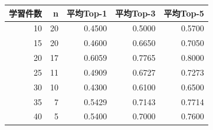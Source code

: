 \begin{tabular}{r r r r r}
\hline
学習件数 & n & 平均Top-1 & 平均Top-3 & 平均Top-5 \\
\hline
10 & 20 & 0.4500 & 0.5000 & 0.5700 \\
15 & 20 & 0.4600 & 0.6650 & 0.7050 \\
20 & 17 & 0.6059 & 0.7765 & 0.8000 \\
25 & 11 & 0.4909 & 0.6727 & 0.7273 \\
30 & 10 & 0.4300 & 0.6100 & 0.6500 \\
35 & 7 & 0.5429 & 0.7143 & 0.7714 \\
40 & 5 & 0.5400 & 0.7000 & 0.7600 \\
\hline
\end{tabular}
